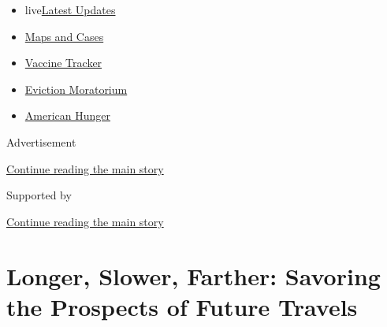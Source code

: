 \begin{itemize}
\tightlist
\item
  live\href{https://www.nytimes3xbfgragh.onion/2020/09/08/world/covid-19-coronavirus.html?name=styln-coronavirus-national\&region=TOP_BANNER\&block=storyline_menu_recirc\&action=click\&pgtype=Article\&impression_id=9bf8d2b0-f1c8-11ea-9737-fd0679c2a2e5\&variant=undefined}{Latest
  Updates}
\item
  \href{https://www.nytimes3xbfgragh.onion/interactive/2020/us/coronavirus-us-cases.html?name=styln-coronavirus-national\&region=TOP_BANNER\&block=storyline_menu_recirc\&action=click\&pgtype=Article\&impression_id=9bf8d2b1-f1c8-11ea-9737-fd0679c2a2e5\&variant=undefined}{Maps
  and Cases}
\item
  \href{https://www.nytimes3xbfgragh.onion/interactive/2020/science/coronavirus-vaccine-tracker.html?name=styln-coronavirus-national\&region=TOP_BANNER\&block=storyline_menu_recirc\&action=click\&pgtype=Article\&impression_id=9bf8d2b2-f1c8-11ea-9737-fd0679c2a2e5\&variant=undefined}{Vaccine
  Tracker}
\item
  \href{https://www.nytimes3xbfgragh.onion/2020/09/02/your-money/eviction-moratorium-covid.html?name=styln-coronavirus-national\&region=TOP_BANNER\&block=storyline_menu_recirc\&action=click\&pgtype=Article\&impression_id=9bf8d2b3-f1c8-11ea-9737-fd0679c2a2e5\&variant=undefined}{Eviction
  Moratorium}
\item
  \href{https://www.nytimes3xbfgragh.onion/interactive/2020/09/02/magazine/food-insecurity-hunger-us.html?name=styln-coronavirus-national\&region=TOP_BANNER\&block=storyline_menu_recirc\&action=click\&pgtype=Article\&impression_id=9bf8f9c0-f1c8-11ea-9737-fd0679c2a2e5\&variant=undefined}{American
  Hunger}
\end{itemize}

Advertisement

\protect\hyperlink{after-top}{Continue reading the main story}

Supported by

\protect\hyperlink{after-sponsor}{Continue reading the main story}

\hypertarget{longer-slower-farther-savoring-the-prospects-of-future-travels}{%
\section{Longer, Slower, Farther: Savoring the Prospects of Future
Travels}\label{longer-slower-farther-savoring-the-prospects-of-future-travels}}

